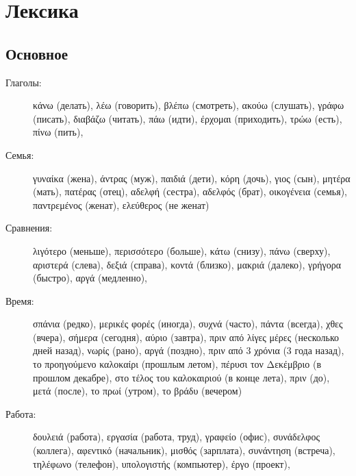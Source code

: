 \documentclass[12pt]{article}
\newcommand{\my}[1]{\textcolor{gray!80!white}{#1}}
\newenvironment{page}{\clearpage\normalsize\null\vfill}{\vfill\null}
\begin{document}
	\begin{page}
		\section{Лексика}
		\subsection{Основное}
		\scriptsize

		\begin{description}
			\item[Глаголы:]
			κάνω \my{(делать)},
			λέω \my{(говорить)},
			βλέπω \my{(смотреть)},
			ακούω \my{(слушать)},
			γράφω \my{(писать)},
			διαβάζω \my{(читать)},
			πάω \my{(идти)},
			έρχομαι \my{(приходить)},
			τρώω \my{(есть)},
			πίνω \my{(пить)},
			
			\item[Семья:]
			γυναίκα \my{(жена)},
			άντρας \my{(муж)},
			παιδιά \my{(дети)},
			κόρη \my{(дочь)},
			γιος \my{(сын)},
			μητέρα \my{(мать)},
			πατέρας \my{(отец)},
			αδελφή \my{(сестра)},
			αδελφός \my{(брат)},
			οικογένεια \my{(семья)},
			παντρεμένος \my{(женат)},
			ελεύθερος \my{(не женат)}
			
			
			\item[Сравнения:]
			λιγότερο \my{(меньше)},
			περισσότερο \my{(больше)},
			κάτω \my{(снизу)},
			πάνω \my{(сверху)},
			αριστερά \my{(слева)},
			δεξιά \my{(справа)},
			κοντά \my{(близко)},
			μακριά \my{(далеко)},
			γρήγορα \my{(быстро)},
			αργά \my{(медленно)},
			
			\item[Время:]
			σπάνια \my{(редко)},
			μερικές φορές \my{(иногда)},
			συχνά \my{(часто)},
			πάντα \my{(всегда)},
			χθες \my{(вчера)},
			σήμερα \my{(сегодня)},
			αύριο \my{(завтра)},
			πριν από λίγες μέρες \my{(несколько дней назад)},
			νωρίς \my{(рано)},
			αργά \my{(поздно)},
			πριν από 3 χρόνια \my{(3 года назад)},
			το προηγούμενο καλοκαίρι \my{(прошлым летом)},
			πέρυσι τον Δεκέμβριο \my{(в прошлом декабре)},
			στο τέλος του καλοκαιριού \my{(в конце лета)},
			πριν \my{(до)},
			μετά \my{(после)},
			το πρωί \my{(утром)},
			το βράδυ \my{(вечером)}
			
			
			\item[Работа:]
			δουλειά \my{(работа)},
			εργασία \my{(работа, труд)},
			γραφείο \my{(офис)},
			συνάδελφος \my{(коллега)},
			αφεντικό \my{(начальник)},
			μισθός \my{(зарплата)},
			συνάντηση \my{(встреча)},
			τηλέφωνο \my{(телефон)},
			υπολογιστής \my{(компьютер)},
			έργο \my{(проект)},
			

\end{description}
\end{page}
\end{document}
